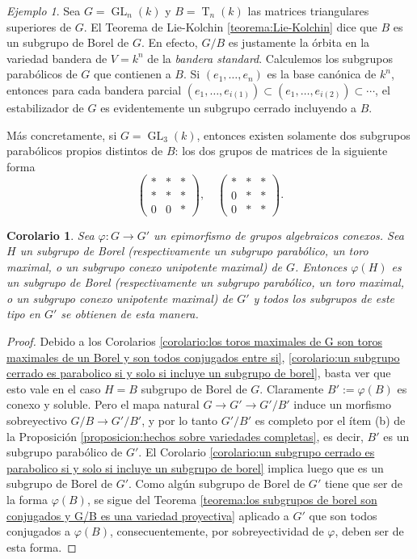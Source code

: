 \documentclass[spanish,12pt]{amsart}
\newtheorem{corollary}[theorem]{Corolario}
\theoremstyle{definition}
\theoremstyle{remark}
\newtheorem{example}[theorem]{Ejemplo}
\numberwithin{equation}{section}
\begin{document}
\begin{example}
Sea $G = \operatorname{GL}_n (k)$ y $B = \operatorname{T}_n (k)$ las matrices triangulares superiores de $G$. El Teorema de Lie-Kolchin \ref{teorema:Lie-Kolchin} dice que $B$ es un subgrupo de Borel de $G$. En efecto, $G/B$ es justamente la órbita en la variedad bandera de $V = k^n$ de la \textit{bandera standard}. Calculemos los subgrupos parabólicos de $G$ que contienen a $B$. Si $(e_1, \ldots, e_n)$ es la base canónica de $k^n$, entonces para cada bandera parcial $(e_1, \ldots, e_{i(1)}) \subset (e_1, \ldots, e_{i(2)}) \subset \cdots$, el estabilizador de $G$ es evidentemente un subgrupo cerrado incluyendo a $B$.

Más concretamente, si $G = \operatorname{GL}_3 (k)$, entonces existen solamente dos subgrupos parabólicos propios distintos de $B$: los dos grupos de matrices de la siguiente forma
\[
    \begin{pmatrix}
    * &* & * \\
    * & * & * \\
    0 & 0 & *
    \end{pmatrix}, \quad
    \begin{pmatrix}
    * &* & * \\
    0 & * & * \\
    0 & * & *
    \end{pmatrix}.
\]
\end{example}

\begin{corollary}\label{corolario:los epimorfismos preservan subgrupos}
Sea $\varphi : G \to G'$ un epimorfismo de grupos algebraicos conexos. Sea $H$ un subgrupo de Borel (respectivamente un subgrupo parabólico, un toro maximal, o un subgrupo conexo unipotente maximal) de $G$. Entonces $\varphi (H)$ es un subgrupo  de Borel (respectivamente un subgrupo parabólico, un toro maximal, o un subgrupo conexo unipotente maximal) de $G'$ y todos los subgrupos de este tipo en $G'$ se obtienen de esta manera.
\end{corollary}
\begin{proof}
Debido a los Corolarios \ref{corolario:los toros maximales de G son toros maximales de un Borel y son todos conjugados entre si}, \ref{corolario:un subgrupo cerrado es parabolico si y solo si incluye un subgrupo de borel}, basta ver que esto vale en el caso $H = B$ subgrupo de Borel de $G$. Claramente $B' := \varphi (B)$ es conexo y soluble. Pero el mapa natural $G \to G' \to G'/B'$ induce un morfismo sobreyectivo $G/B \to G'/B'$, y por lo tanto $G'/B'$ es completo por el ítem (b) de la Proposición \ref{proposicion:hechos sobre variedades completas}, es decir, $B'$ es un subgrupo parabólico de $G'$. El Corolario \ref{corolario:un subgrupo cerrado es parabolico si y solo si incluye un subgrupo de borel} implica luego que es un subgrupo de Borel de $G'$. Como algún subgrupo de Borel de $G'$ tiene que ser de la forma $\varphi (B)$, se sigue del Teorema \ref{teorema:los subgrupos de borel son conjugados y G/B es una variedad proyectiva} aplicado a $G'$ que son todos conjugados a $\varphi (B)$, consecuentemente, por sobreyectividad de $\varphi$, deben ser de esta forma.
\end{proof}
\end{document}
